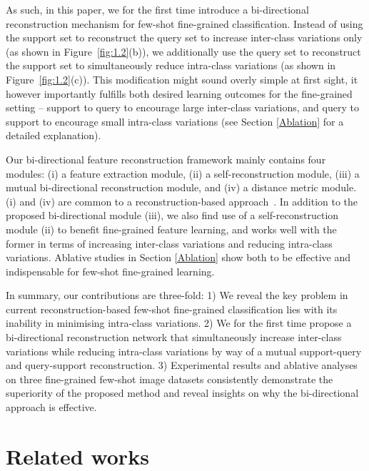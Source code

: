 \documentclass[letterpaper]{article} %
\begin{document}
As such, in this paper, we for the first time introduce a bi-directional reconstruction mechanism for few-shot fine-grained classification. Instead of using the support set to reconstruct the query set to increase inter-class variations only (as shown in Figure~\ref{fig:1.2}(b)),
we additionally use the query set to reconstruct the support set to simultaneously reduce intra-class variations (as shown in Figure~\ref{fig:1.2}(c)). This modification might sound overly simple at first sight, it however importantly fulfills both desired learning outcomes for the fine-grained setting -- support to query to encourage large inter-class variations, and query to support to encourage small intra-class variations
(see Section \ref{Ablation} for a detailed explanation).


Our bi-directional feature reconstruction framework mainly contains four modules: (i) a feature extraction module, (ii) a self-reconstruction module, (iii) a mutual bi-directional reconstruction module, and (iv) a distance metric module. (i) and (iv) are common to a reconstruction-based approach~\cite{Wertheimer_2021_CVPR}. In addition to the proposed bi-directional module (iii), we also find use of a self-reconstruction module (ii) to benefit fine-grained feature learning, and works well with the former in terms of increasing inter-class variations and reducing intra-class variations. Ablative studies in Section \ref{Ablation} show both to be effective {and indispensable} for few-shot fine-grained learning.



In summary, our contributions are three-fold:
1) We reveal the key problem in current reconstruction-based few-shot fine-grained classification lies with its inability in minimising intra-class variations.
2) We for the first time propose a bi-directional reconstruction network that simultaneously increase inter-class variations while reducing intra-class variations by way of a mutual {support-query and query-support} reconstruction.
3) Experimental results and ablative analyses on three fine-grained few-shot image datasets consistently demonstrate the superiority of the proposed method and reveal insights on why the bi-directional approach is effective.




\section{Related works}
\end{document}
